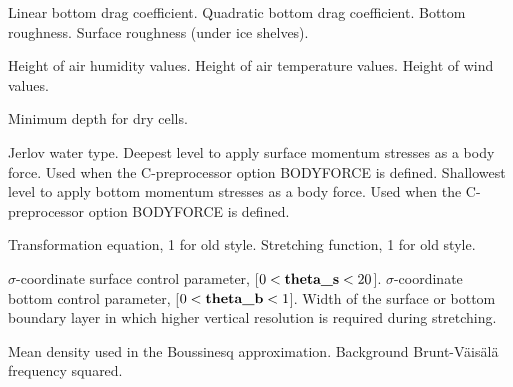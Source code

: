 \begin{klist}
     \begin{klist}
            Linear bottom drag coefficient.
           Quadratic bottom drag coefficient.
              Bottom roughness.
              Surface roughness (under ice shelves).
     \end{klist}
    \mbox{}
     \begin{klist}
        Height of air humidity values.
        Height of air temperature values.
        Height of wind values.
     \end{klist}
    \mbox{}
     \begin{klist}
         Minimum depth for dry cells.
     \end{klist}
    \mbox{}
     \begin{klist}
         Jerlov water type.
         Deepest level to apply surface momentum
     stresses as a body force.
            Used when the C-preprocessor option BODYFORCE is defined.
         Shallowest level to apply bottom momentum
    stresses as a body force.
            Used when the C-preprocessor option BODYFORCE is defined.
     \end{klist}
    \mbox{}
     \begin{klist}
        Transformation equation, 1 for old style.
        Stretching function, 1 for old style.
     \end{klist}
    \mbox{}
     \begin{klist}
         $\sigma$-coordinate surface control parameter,
     [$0 < \mbox{\bf theta\_s} < 20$].
         $\sigma$-coordinate bottom  control parameter,
     [$0 < \mbox{\bf theta\_b} < 1$].
          Width of the surface or bottom boundary layer
     in which higher vertical resolution is required during stretching.
     \end{klist}
    \mbox{}
     \begin{klist}
            Mean density used in the Boussinesq
     approximation.
        Background Brunt-V\"ais\"al\"a frequency squared.
     \end{klist}

\end{klist}
